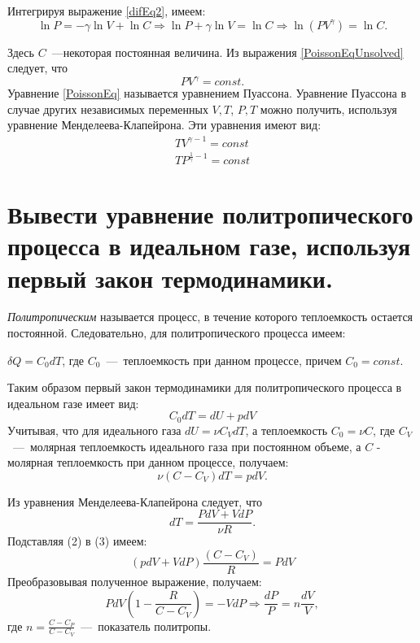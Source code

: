 Интегрируя выражение \ref{difEq2}, имеем:
\begin{equation} \label{PoissonEqUnsolved}
  \ln P = -\gamma \ln V + \ln C \Rightarrow \ln P + \gamma\ln V = \ln C \Rightarrow \ln (PV^\gamma) = \ln C.
\end{equation}

Здесь $C$~---некоторая постоянная величина. Из выражения \ref{PoissonEqUnsolved} следует, что 
\begin{equation} \label{PoissonEq}
  PV^\gamma = const.
\end{equation}
Уравнение \ref{PoissonEq} называется уравнением Пуассона. Уравнение Пуассона в
случае других независимых переменных $V, T$, $P, T$ можно получить, используя уравнение Менделеева-Клапейрона. Эти уравнения имеют вид:
\begin{eqnarray}
  TV^{\gamma-1} = const \\
  TP^{\frac{1}{\gamma}-1} = const
\end{eqnarray}

\section{Вывести уравнение политропического процесса в идеальном
газе, используя первый закон термодинамики.} \label{task3-5}

\solving{}

\emph{Политропическим} называется процесс, в течение которого
теплоемкость остается постоянной. Следовательно, для политропического
процесса имеем:

$\delta Q = C_0 dT$, где $C_0$~---~теплоемкость при данном процессе,
причем $C_0 = const$.

Таким образом первый закон термодинамики для политропического процесса в
идеальном газе имеет вид:
\begin{equation}
  C_0dT = dU +pdV
\end{equation}
Учитывая, что для идеального газа $dU = \nu C_VdT$, а
теплоемкость $C_0 = \nu C$, где $C_V$~---~молярная теплоемкость идеального газа при
постоянном объеме, а $C$ - молярная теплоемкость при данном
процессе, получаем:
\begin{equation}
  ν (C - C_V ) dT = pdV.
\end{equation}

Из уравнения Менделеева-Клапейрона следует, что
\begin{equation}
  dT = \frac{PdV + VdP}{\nu R}.
\end{equation}
Подставляя (2) в (3) имеем:
\begin{equation}
  (pdV + VdP)\frac{(C - C_V)}{R} =PdV
\end{equation}
Преобразовывая полученное выражение, получаем:
\begin{equation} \label{difPolitrop}
  PdV \left (1 - \frac{R}{C-C_V} \right ) = - VdP \Rightarrow \frac{dP}{P} = n \frac{dV}{V},
\end{equation}
где $n = \frac{C -C_P}{C- C_V}$~---~показатель политропы.

